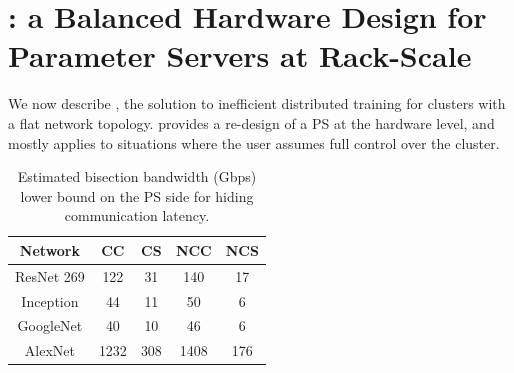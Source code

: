\section{\pbox: a Balanced Hardware Design for Parameter Servers at Rack-Scale}
\label{sec:phub}
We now describe \pbox, the solution to inefficient distributed training for clusters with a flat network topology. \pbox provides a re-design of a PS at the hardware level, and mostly applies to situations where the user assumes full control over the cluster.

\begin{table}
        \centering
        \footnotesize
	\begin{tabular}{|c|c|c|c|c|}
		\hline
		Network   & CC & CS & NCC & NCS\\
		\hline
		ResNet 269    & 122   & 31   & 140    &  17   \\
		\hline
		Inception & 44   &  11  &  50   &  6  \\
		\hline
		GoogleNet & 40   &  10  &  46   &  6  \\
	
		\hline 
		AlexNet   & 1232  &  308  & 1408    &  176  \\
		\hline
	\end{tabular}
	\caption{Estimated bisection bandwidth (Gbps) lower bound on the PS side for hiding communication latency.}
	\label{table:bwReqDC}
\end{table}

